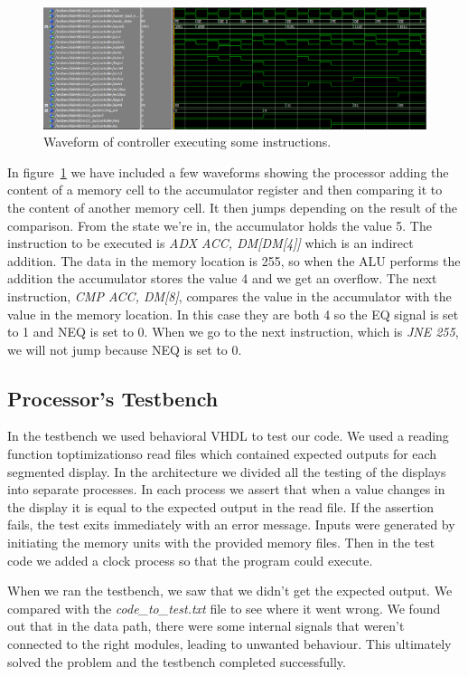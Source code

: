 \documentclass[a4,11pt]{article}
\begin{document}
\begin{figure}[h!]
	\centering
	\includegraphics[width=1\textwidth]{Figurer/controller.PNG}
	\caption{Waveform of controller executing some instructions.}
	\label{fig:con}
\end{figure}
\newpage
In figure~\ref{fig:con} we have included a few waveforms showing the processor adding the content 
of a memory cell to the accumulator register and then comparing it to the content of another memory
cell. It then jumps depending on the result of the comparison. From the state we're in, the
accumulator holds the value 5. The instruction to be executed is {\it ADX ACC, DM[DM[4]]} which is an
indirect addition. The data in the memory location is 255, so when the ALU performs the addition
the accumulator stores the value 4 and we get an overflow. The next instruction, \emph{CMP ACC, DM[8]},
compares the value in the accumulator with the value in the memory location. In this case they are
both 4 so the EQ signal is set to 1 and NEQ is set to 0. When we go to the next instruction, which is
{\it JNE 255}, we will not jump because NEQ is set to 0.

\subsection{Processor's Testbench}

In the testbench we used behavioral VHDL to test our code. We used a reading function toptimizationso read files which
contained expected outputs for each segmented display. In the architecture we divided all the testing 
of the displays into separate processes. In each process we assert that when a value changes in the display
it is equal to the expected output in the read file. If the assertion fails, the test exits immediately 
with an error message. Inputs were generated by initiating the memory units with the provided memory files.
Then in the test code we added a clock process so that the program could execute.

When we ran the testbench, we saw that we didn't get the expected output. We compared with the
{\it code\_to\_test.txt} file to see where it went wrong. We found out that in the data path,
there were some internal signals that weren't connected to the right modules, leading to unwanted
behaviour. This ultimately solved the problem and the testbench completed successfully.
\end{document}

